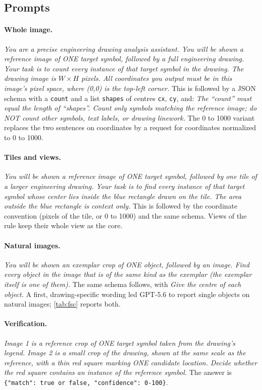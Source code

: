 \subsection{Prompts}
\label{sec:prompts}

\paragraph{Whole image.} \textit{You are a precise engineering drawing analysis assistant. You will be shown a reference image of ONE target symbol, followed by a full engineering drawing. Your task is to count every instance of that target symbol in the drawing. The drawing image is $W \times H$ pixels. All coordinates you output must be in this image's pixel space, where (0,0) is the top-left corner.} This is followed by a JSON schema with a \texttt{count} and a list \texttt{shapes} of centres \texttt{cx}, \texttt{cy}, and: \textit{The ``count'' must equal the length of ``shapes''. Count only symbols matching the reference image; do NOT count other symbols, text labels, or drawing linework.} The 0 to 1000 variant replaces the two sentences on coordinates by a request for coordinates normalized to 0 to 1000.

\paragraph{Tiles and views.} \textit{You will be shown a reference image of ONE target symbol, followed by one tile of a larger engineering drawing. Your task is to find every instance of that target symbol whose center lies inside the blue rectangle drawn on the tile. The area outside the blue rectangle is context only.} This is followed by the coordinate convention (pixels of the tile, or 0 to 1000) and the same schema. Views of the rule keep their whole view as the core.

\paragraph{Natural images.} \textit{You will be shown an exemplar crop of ONE object, followed by an image. Find every object in the image that is of the same kind as the exemplar (the exemplar itself is one of them).} The same schema follows, with \textit{Give the centre of each object.} A first, drawing-specific wording led GPT-5.6 to report single objects on natural images; \cref{tab:fsc} reports both.

\paragraph{Verification.} \textit{Image 1 is a reference crop of ONE target symbol taken from the drawing's legend. Image 2 is a small crop of the drawing, shown at the same scale as the reference, with a thin red square marking ONE candidate location. Decide whether the red square contains an instance of the reference symbol.} The answer is \texttt{\{"match": true or false, "confidence": 0-100\}}.

